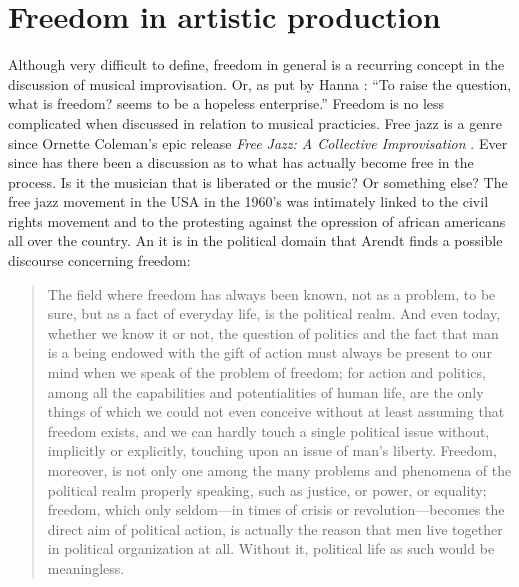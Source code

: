 \documentclass[a4paper]{article}
\begin{document}
\section{Freedom in artistic production}
\label{sec:freed-artist-prod}

Although very difficult to define, freedom in general is a recurring concept in the discussion of musical improvisation. Or, as put by Hanna \citet{arendt77}: ``To raise the question, what is freedom? seems to be a hopeless enterprise.'' Freedom is no less complicated when discussed in relation to musical practicies. Free jazz is a genre since Ornette Coleman's epic release \emph{Free Jazz: A Collective Improvisation} \citep{coleman60}. Ever since has there been a discussion as to what has actually become free in the process. Is it the musician that is liberated or the music? Or something else? The free jazz movement in the USA in the 1960's was intimately linked to the civil rights movement and to the protesting against the opression of african americans all over the country. An it is in the political domain that Arendt finds a possible discourse concerning freedom:

\begin{quote}
  The field where freedom has always been known, not as a problem, to be sure, but as a fact of   everyday life, is the political realm. And even today, whether we know it or not, the question   of politics and the fact that man is a being endowed with the gift of action must always be   present to our mind when we speak of the problem of freedom; for action and politics, among   all the capabilities and potentialities of human life, are the only things of which we could   not even conceive without at least assuming that freedom exists, and we can hardly touch a   single political issue without, implicitly or explicitly, touching upon an issue of man's   liberty.  Freedom, moreover, is not only one among the many problems and phenomena of the   political realm properly speaking, such as justice, or power, or equality; freedom, which only   seldom---in times of crisis or revolution---becomes the direct aim of political action, is   actually the reason that men live together in political organization at all. Without it,   political life as such would be meaningless. \citep{arendt77}
\end{quote}
\end{document}
